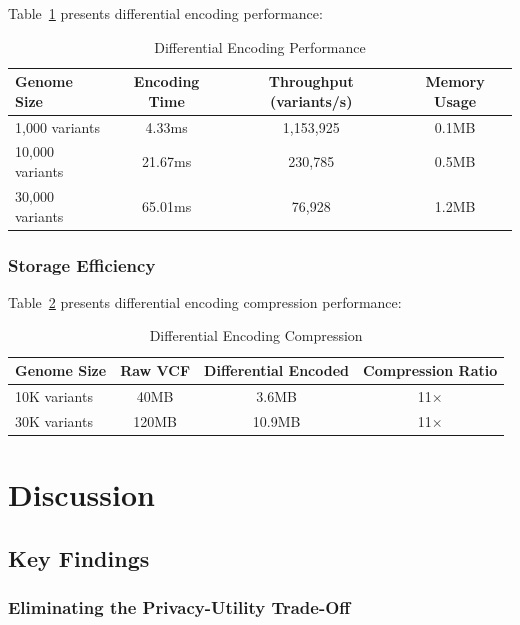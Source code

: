 \documentclass[11pt,letterpaper]{article}
\begin{document}
Table~\ref{tab:differential_encoding} presents differential encoding performance:

\begin{table}[!ht]
\centering
\caption{Differential Encoding Performance}
\label{tab:differential_encoding}
\begin{tabular}{lccc}
\toprule
\textbf{Genome Size} & \textbf{Encoding Time} & \textbf{Throughput (variants/s)} & \textbf{Memory Usage} \\
\midrule
1,000 variants & 4.33ms & 1,153,925 & 0.1MB \\
10,000 variants & 21.67ms & 230,785 & 0.5MB \\
30,000 variants & 65.01ms & 76,928 & 1.2MB \\
\bottomrule
\end{tabular}
\end{table}

\subsubsection{Storage Efficiency}

Table~\ref{tab:differential_compression} presents differential encoding compression performance:

\begin{table}[!ht]
\centering
\caption{Differential Encoding Compression}
\label{tab:differential_compression}
\begin{tabular}{lccc}
\toprule
\textbf{Genome Size} & \textbf{Raw VCF} & \textbf{Differential Encoded} & \textbf{Compression Ratio} \\
\midrule
10K variants & 40MB & 3.6MB & 11$\times$ \\
30K variants & 120MB & 10.9MB & 11$\times$ \\
\bottomrule
\end{tabular}
\end{table}

\section{Discussion}
\label{sec:discussion}

\subsection{Key Findings}

\subsubsection{Eliminating the Privacy-Utility Trade-Off}
\end{document}
